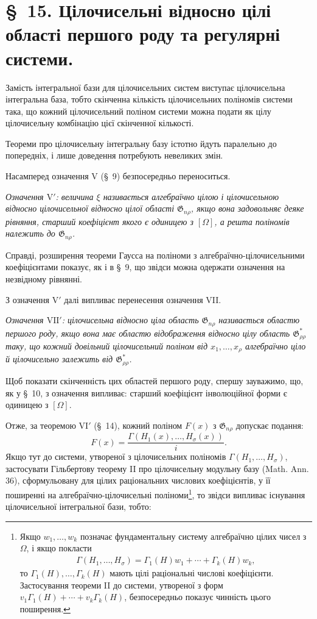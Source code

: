 \documentclass[11pt]{article}
\providecommand{\Gdom}{\mathfrak{G}}
\begin{document}
\section*{\S\ 15. Цілочисельні відносно цілі області першого роду та регулярні системи.}

Замість інтегральної бази для цілочисельних систем виступає цілочисельна інтегральна база, тобто скінченна кількість цілочисельних поліномів системи така, що кожний цілочисельний поліном системи можна подати як цілу цілочисельну комбінацію цієї скінченної кількості.

Теореми про цілочисельну інтегральну базу істотно йдуть паралельно до попередніх, і лише доведення потребують невеликих змін.

Насамперед означення V (\S\ 9) безпосередньо переноситься.

\emph{Означення $\mathrm{V}'$: величина $\xi$ називається алгебраїчно цілою і цілочисельною відносно цілочисельної відносно цілої області $\Gdom_{n\rho}$, якщо вона задовольняє деяке рівняння, старший коефіцієнт якого є одиницею з $[\Omega]$, а решта поліномів належить до $\Gdom_{n\rho}$.}

Справді, розширення теореми Гаусса на поліноми з алгебраїчно-цілочисельними коефіцієнтами показує, як і в \S\ 9, що звідси можна одержати означення на незвідному рівнянні.

З означення $\mathrm{V}'$ далі випливає перенесення означення VII.

\emph{Означення $\mathrm{VII}'$: цілочисельна відносно ціла область $\Gdom_{n\rho}$ називається областю першого роду, якщо вона має областю відображення відносно цілу область $\Gdom^*_{\rho\rho}$ таку, що кожний довільний цілочисельний поліном від $x_1,\ldots,x_\rho$ алгебраїчно ціло й цілочисельно залежить від $\Gdom^*_{\rho\rho}$.}

Щоб показати скінченність цих областей першого роду, спершу зауважимо, що, як у \S\ 10, з означення випливає: старший коефіцієнт інволюційної форми є одиницею з $[\Omega]$.

Отже, за теоремою $\mathrm{VI}'$ (\S\ 14), кожний поліном $F(x)$ з $\Gdom_{n\rho}$ допускає подання:
\[
  F(x)=\frac{\Gamma(H_1(x),\ldots,H_\sigma(x))}{i}.
\]
Якщо тут до системи, утвореної з цілочисельних поліномів $\Gamma(H_1,\ldots,H_\sigma)$, застосувати Гільбертову теорему II про цілочисельну модульну базу (Math. Ann. 36), сформульовану для цілих раціональних числових коефіцієнтів, у її поширенні на алгебраїчно-цілочисельні поліноми\footnote{Якщо $w_1,\ldots,w_k$ позначає фундаментальну систему алгебраїчно цілих чисел з $\Omega$, і якщо покласти
\[
\begin{gathered}
  \Gamma(H_1,\ldots,H_\sigma)
  =\Gamma_1(H)w_1+\cdots+\Gamma_k(H)w_k,
\end{gathered}
\]
то $\Gamma_1(H),\ldots,\Gamma_k(H)$ мають цілі раціональні числові коефіцієнти. Застосування теореми II до системи, утвореної з форм $v_1\Gamma_1(H)+\cdots+v_k\Gamma_k(H)$, безпосередньо показує чинність цього поширення.}, то звідси випливає існування цілочисельної інтегральної бази, тобто:
\end{document}
